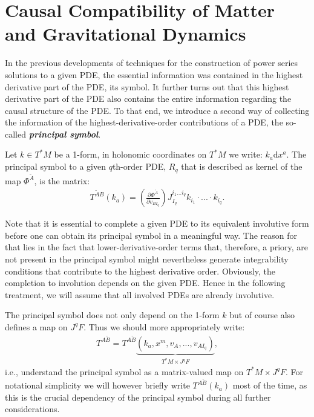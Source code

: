 \section{Causal Compatibility of Matter and Gravitational Dynamics}
In the previous developments of techniques for the construction of power series solutions to a given PDE, the essential information was contained in the highest derivative part of the PDE, its symbol. 
It further turns out that this highest derivative part of the PDE also contains the entire information regarding the causal structure of the PDE. To that end, we introduce a second way of collecting the information of the highest-derivative-order contributions of a PDE, the so-called \textbf{\textit{principal symbol}}.
\begin{definition} \label{PSym}
Let $ k \in T^{\ast}M$ be a  1-form, in holonomic coordinates on $T^{\ast}M$ we write: $k_{a} \mathrm{d}x^a$. The principal symbol to a given $q$th-order PDE, $R_q$ that is described as kernel of the map $\Phi^{\tilde{A}}$, is the matrix:
\begin{align}
    T^{\tilde{A} B}(k_a) = \left ( \frac{\partial \Phi^{\tilde{A}}}{\partial v_{BI_q}} \right ) J_{I_q}^{i_1...i_q} k_{i_1} \cdot ... \cdot k_{i_q}.
\end{align}
\end{definition}
\begin{remark}
Note that it is essential to complete a given PDE to its equivalent involutive form before one can obtain its principal symbol in a meaningful way. The reason for that lies in the fact that lower-derivative-order terms that, therefore, a priory, are not present in the principal symbol might nevertheless generate integrability conditions that contribute to the highest derivative order. Obviously, the completion to involution depends on the given PDE. Hence in the following treatment, we will assume that all involved PDEs are already involutive.
\end{remark}
The principal symbol does not only depend on the 1-form $k$ but of course also defines a map on $J^qF$. Thus we should more appropriately write:
\begin{align}
    T^{A\tilde{B}} = T^{A\tilde{B}}\underbrace{(k_a,x^m,v_A,...,v_{AI_q})}_{T^{\ast}M \times J^qF},
\end{align}
i.e., understand the principal symbol as a matrix-valued map on $T^{\ast}M \times J^qF$. 
For notational simplicity we will however briefly write $T^{A\tilde{B}}(k_a)$ most of the time, as this is the crucial dependency of the principal symbol during all further considerations.

